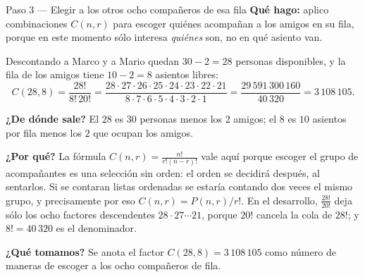 \documentclass[11pt]{article}
\begin{document}
\begin{paso}{Paso 3 --- Elegir a los otros ocho compañeros de esa fila}
\textbf{Qué hago:} aplico combinaciones $C(n,r)$ para escoger quiénes acompañan a los amigos en su fila, porque en este momento sólo interesa \emph{quiénes} son, no en qué asiento van.

Descontando a Marco y a Mario quedan $30-2=28$ personas disponibles, y la fila de los amigos tiene $10-2=8$ asientos libres:
\[
  C(28,8)=\frac{28!}{8!\,20!}
  =\frac{28\cdot 27\cdot 26\cdot 25\cdot 24\cdot 23\cdot 22\cdot 21}{8\cdot 7\cdot 6\cdot 5\cdot 4\cdot 3\cdot 2\cdot 1}
  =\frac{29\,591\,300\,160}{40\,320}=3\,108\,105 .
\]

\textbf{¿De dónde sale?} El $28$ es $30$ personas menos los $2$ amigos; el $8$ es $10$ asientos por fila menos los $2$ que ocupan los amigos.

\textbf{¿Por qué?} La fórmula $C(n,r)=\frac{n!}{r!(n-r)!}$ vale aquí porque escoger el grupo de acompañantes es una selección sin orden: el orden se decidirá después, al sentarlos. Si se contaran listas ordenadas se estaría contando dos veces el mismo grupo, y precisamente por eso $C(n,r)=P(n,r)/r!$. En el desarrollo, $\frac{28!}{20!}$ deja sólo los ocho factores descendentes $28\cdot 27\cdots 21$, porque $20!$ cancela la cola de $28!$; y $8!=40\,320$ es el denominador.

\textbf{¿Qué tomamos?} Se anota el factor $C(28,8)=3\,108\,105$ como número de maneras de escoger a los ocho compañeros de fila.
\end{paso}
\end{document}
